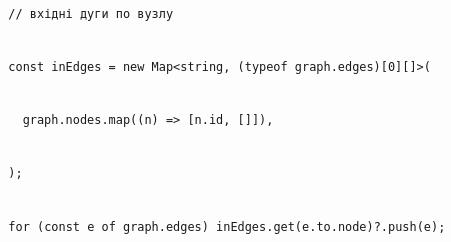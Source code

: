 \documentclass[
]{article}
\newcommand{\passthrough}[1]{#1}
\begin{document}
\strut \\
\passthrough{\lstinline!  !}\passthrough{\lstinline!//!}\passthrough{\lstinline! !}\passthrough{\lstinline!вхідні!}\passthrough{\lstinline! !}\passthrough{\lstinline!дуги!}\passthrough{\lstinline! !}\passthrough{\lstinline!по!}\passthrough{\lstinline! !}\passthrough{\lstinline!вузлу!}\strut \\
\passthrough{\lstinline!  !}\passthrough{\lstinline!const!}\passthrough{\lstinline! !}\passthrough{\lstinline!inEdges!}\passthrough{\lstinline! !}\passthrough{\lstinline!=!}\passthrough{\lstinline! !}\passthrough{\lstinline!new!}\passthrough{\lstinline! !}\passthrough{\lstinline!Map!}\passthrough{\lstinline!<!}\passthrough{\lstinline!string!}\passthrough{\lstinline!,!}\passthrough{\lstinline! !}\passthrough{\lstinline!(!}\passthrough{\lstinline!typeof!}\passthrough{\lstinline! !}\passthrough{\lstinline!graph!}\passthrough{\lstinline!.!}\passthrough{\lstinline!edges!}\passthrough{\lstinline!)[0][]>(!}\strut \\
\passthrough{\lstinline!    !}\passthrough{\lstinline!graph!}\passthrough{\lstinline!.!}\passthrough{\lstinline!nodes!}\passthrough{\lstinline!.!}\passthrough{\lstinline!map!}\passthrough{\lstinline!((!}\passthrough{\lstinline!n!}\passthrough{\lstinline!)!}\passthrough{\lstinline! !}\passthrough{\lstinline!=>!}\passthrough{\lstinline! !}\passthrough{\lstinline![!}\passthrough{\lstinline!n!}\passthrough{\lstinline!.!}\passthrough{\lstinline!id!}\passthrough{\lstinline!,!}\passthrough{\lstinline! !}\passthrough{\lstinline![]]),!}\strut \\
\passthrough{\lstinline!  !}\passthrough{\lstinline!);!}\strut \\
\passthrough{\lstinline!  !}\passthrough{\lstinline!for!}\passthrough{\lstinline! !}\passthrough{\lstinline!(!}\passthrough{\lstinline!const!}\passthrough{\lstinline! !}\passthrough{\lstinline!e!}\passthrough{\lstinline! !}\passthrough{\lstinline!of!}\passthrough{\lstinline! !}\passthrough{\lstinline!graph!}\passthrough{\lstinline!.!}\passthrough{\lstinline!edges!}\passthrough{\lstinline!)!}\passthrough{\lstinline! !}\passthrough{\lstinline!inEdges!}\passthrough{\lstinline!.!}\passthrough{\lstinline!get!}\passthrough{\lstinline!(!}\passthrough{\lstinline!e!}\passthrough{\lstinline!.!}\passthrough{\lstinline!to!}\passthrough{\lstinline!.!}\passthrough{\lstinline!node!}\passthrough{\lstinline!)?.!}\passthrough{\lstinline!push!}\passthrough{\lstinline!(!}\passthrough{\lstinline!e!}\passthrough{\lstinline!);!}\strut \\
\strut \\
\end{document}
